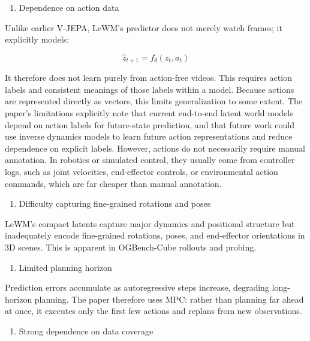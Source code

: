 \begin{enumerate}
\def\labelenumi{\arabic{enumi}.}
\tightlist
\item
  Dependence on action data
\end{enumerate}

Unlike earlier V-JEPA, LeWM's predictor does not merely watch frames; it explicitly models:

\[
\hat{z}_{t+1} = f_\theta(z_t, a_t)
\]

It therefore does not learn purely from action-free videos. This requires action labels and consistent meanings of those labels within a model. Because actions are represented directly as vectors, this limits generalization to some extent. The paper's limitations explicitly note that current end-to-end latent world models depend on action labels for future-state prediction, and that future work could use inverse dynamics models to learn future action representations and reduce dependence on explicit labels. However, actions do not necessarily require manual annotation. In robotics or simulated control, they usually come from controller logs, such as joint velocities, end-effector controls, or environmental action commands, which are far cheaper than manual annotation.

\begin{enumerate}
\def\labelenumi{\arabic{enumi}.}
\setcounter{enumi}{1}
\tightlist
\item
  Difficulty capturing fine-grained rotations and poses
\end{enumerate}

LeWM's compact latents capture major dynamics and positional structure but inadequately encode fine-grained rotations, poses, and end-effector orientations in 3D scenes. This is apparent in OGBench-Cube rollouts and probing.

\begin{enumerate}
\def\labelenumi{\arabic{enumi}.}
\setcounter{enumi}{2}
\tightlist
\item
  Limited planning horizon
\end{enumerate}

Prediction errors accumulate as autoregressive steps increase, degrading long-horizon planning. The paper therefore uses MPC: rather than planning far ahead at once, it executes only the first few actions and replans from new observations.

\begin{enumerate}
\def\labelenumi{\arabic{enumi}.}
\setcounter{enumi}{3}
\tightlist
\item
  Strong dependence on data coverage
\end{enumerate}

